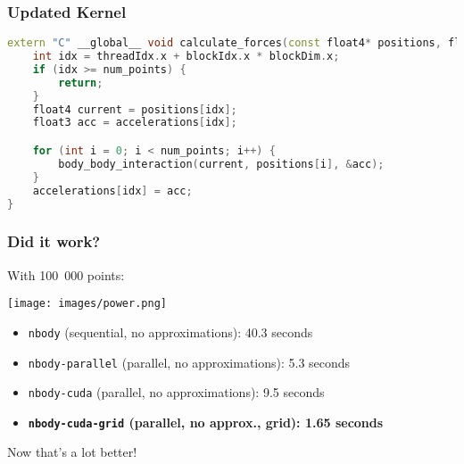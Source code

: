 \begin{frame}[fragile]
\frametitle{Updated Kernel}

\begin{lstlisting}[language=C++]
extern "C" __global__ void calculate_forces(const float4* positions, float3* accelerations, int num_points) {
    int idx = threadIdx.x + blockIdx.x * blockDim.x;
    if (idx >= num_points) {
        return;
    }
    float4 current = positions[idx];
    float3 acc = accelerations[idx];

    for (int i = 0; i < num_points; i++) {
        body_body_interaction(current, positions[i], &acc);
    }
    accelerations[idx] = acc;
}
\end{lstlisting}

\end{frame}


\begin{frame}
\frametitle{Did it work?}

With 100~000 points:

\begin{center}
	\texttt{[image: images/power.png]}
\end{center}

\begin{itemize}
	\item \texttt{nbody} (sequential, no approximations): 40.3 seconds
	\item \texttt{nbody-parallel} (parallel, no approximations): 5.3 seconds
	\item \texttt{nbody-cuda} (parallel, no approximations): 9.5 seconds
	\item \textbf{\texttt{nbody-cuda-grid} (parallel, no approx., grid): 1.65 seconds}
\end{itemize}

 Now that's a lot better!

\end{frame}



